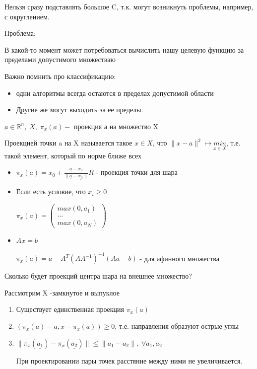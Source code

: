\documentclass[a4paper, 12pt]{article}
\begin{document}
	Нельзя сразу подставлять большое C, т.к. могут возникнуть проблемы, например, с округлением.
	
	Проблема:
	
	В какой-то момент может потребоваться вычислить нашу целевую функцию за пределами допустимого множестваю
	
	Важно помнить про классификацию:
	
	\begin{itemize}
		\item одни алгоритмы всегда остаются в пределах допустимой области 
		\item Другие же могут выходить за ее пределы.
	\end{itemize}
	
	$\underbar{a} \in \mathbb {R}^n, \; X, \; \pi_x(\underbar{a}) - $ проекция а на множество X
	
	Проекцией точки a на X называется такое $x \in X$, что $\|x-a\|^2 \mapsto \underset{x \in X}{min}$, т.е. такой элемент, который по норме ближе всех
	
	\begin{itemize}
		\item $\pi_x(\underline{a}) = x_0 + \frac{\underline{a}-\underline{x_0}}{\|\underline{a}-\underline{x_0}\|}R $ - проекция точки для шара
		
		
		\item Если есть условие, что $x_i \geq 0$
		
		$\pi_x(a) = 
		\begin{pmatrix}
			max(0, a_1)\\
			...\\
			max(0, a_N)
		\end{pmatrix}$
		
		\item $A\underbar{x} = b$
		
		$\pi_x(\underbar{a}) = \underbar{a} - A^T(AA^{-1})^{-1}(A\underbar{a} - \underbar{b})$ - для афинного множества
		
	\end{itemize}
	
	Сколько будет проекций центра шара на внешнее множество?
	
	Рассмотрим X -замкнутое и выпуклое
	
	\begin{enumerate}
		\item Существует единственная проекция $\pi_x(a)$
		
		\item $(\pi_x(\underbar{a}) - \underbar{a}, x - \pi_x(\underbar{a})) \geq 0$, т.е. направления образуют острые углы
		
		\item $\|\pi_x(\underline{a_1}) - \pi_x(\underline{a_2})\| \leq \|a_1 - a_2\|, \; \forall a_1, a_2$
		
		При проектировании пары точек расстяние между ними не увеличивается.
	\end{enumerate}
	
\end{document}
